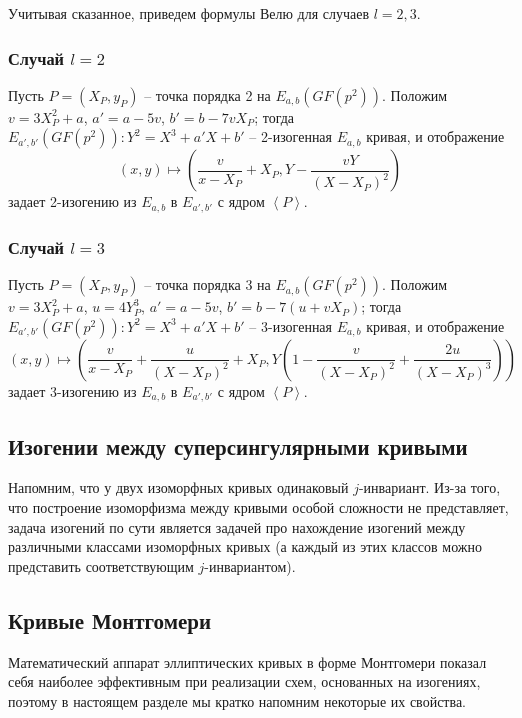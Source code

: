 \documentclass[a4paper,12pt]{article}
\newcommand{\tr}[1]{\left\langle #1\right\rangle}
\theoremstyle{definition}
\begin{document}
Учитывая сказанное, приведем формулы Велю для случаев $l=2,3$.

 \subsubsection*{Случай $l=2$}
Пусть  $P=(X_P,y_P)$ -- точка порядка 2 на $E_{a,b}(GF(p^2))$. Положим $v=3X_P^2+a$, $a'=a-5v$, $b'=b-7vX_P$;
тогда $E_{a',b'}(GF(p^2)): Y^2=X^3+a'X+b'$ -- 2-изогенная $E_{a,b}$ кривая, и  отображение
 $$
 (x,y)\mapsto \left(\frac{v}{x-X_P}+X_P, Y-\frac{vY}{(X-X_P)^2}\right) 
 $$
 задает 2-изогению из $E_{a,b}$ в $E_{a',b'}$ с ядром $\tr{P}$. 

   
 \subsubsection*{Случай $l=3$}
 Пусть $P=(X_P,y_P)$ -- точка порядка 3 на $E_{a,b}(GF(p^2))$. Положим $v=3X_P^2+a$, $u=4Y_P^3$, $a'=a-5v$, $b'=b-7(u+vX_P)$;
 тогда $E_{a',b'}(GF(p^2)): Y^2=X^3+a'X+b'$ -- 3-изогенная $E_{a,b}$ кривая, и
 отображение
 $$
 (x,y)\mapsto \left(\frac{v}{x-X_P}+\frac{u}{(X-X_P)^2}+X_P, Y\left(1-\frac{v}{(X-X_P)^2}+\frac{2u}{(X-X_P)^3}\right)\right) 
 $$
 задает 3-изогению из $E_{a,b}$ в $E_{a',b'}$ с ядром $\tr{P}$. 

  
  
\subsection{Изогении между суперсингулярными кривыми}

Напомним, что у двух изоморфных кривых одинаковый $j$-инвариант.
Из-за того, что построение изоморфизма между кривыми особой сложности не представляет, 
задача  изогений по сути является задачей про нахождение изогений между различными классами изоморфных кривых (а каждый из этих классов можно представить  соответствующим $j$-инвариантом).


\subsection{Кривые Монтгомери}
 

Математический аппарат эллиптических кривых в форме Монтгомери \cite{Mon} показал себя наиболее эффективным
при реализации схем, основанных на изогениях, поэтому в настоящем разделе мы кратко напомним некоторые их свойства.
\end{document}
